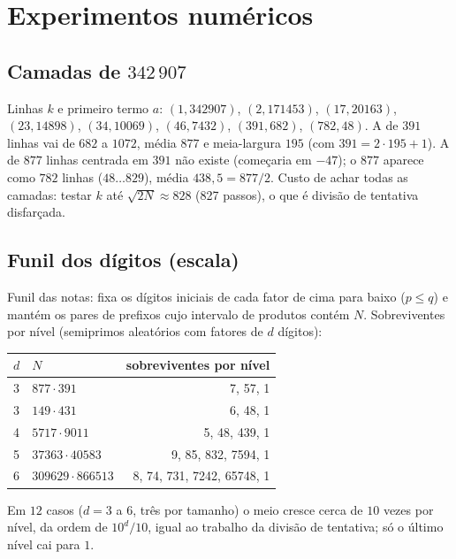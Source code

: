 \documentclass[11pt,a4paper]{article}
\begin{document}
\section{Experimentos numéricos}

\subsection{Camadas de $342\,907$}
Linhas $k$ e primeiro termo $a$: $(1,342907)$, $(2,171453)$, $(17,20163)$, $(23,14898)$, $(34,10069)$, $(46,7432)$, $(391,682)$, $(782,48)$. A de $391$ linhas vai de $682$ a $1072$, média $877$ e meia-largura $195$ (com $391=2\cdot195+1$). A de $877$ linhas centrada em $391$ não existe (começaria em $-47$); o $877$ aparece como $782$ linhas ($48\ldots829$), média $438{,}5=877/2$. Custo de achar todas as camadas: testar $k$ até $\sqrt{2N}\approx828$ (827 passos), o que é divisão de tentativa disfarçada.

\subsection{Funil dos dígitos (escala)}
Funil das notas: fixa os dígitos iniciais de cada fator de cima para baixo ($p\le q$) e mantém os pares de prefixos cujo intervalo de produtos contém $N$. Sobreviventes por nível (semiprimos aleatórios com fatores de $d$ dígitos):
\begin{center}
\begin{tabular}{llr}
\toprule
$d$ & $N$ & sobreviventes por nível \\
\midrule
3 & $877\cdot391$ & 7, 57, 1 \\
3 & $149\cdot431$ & 6, 48, 1 \\
4 & $5717\cdot9011$ & 5, 48, 439, 1 \\
5 & $37363\cdot40583$ & 9, 85, 832, 7594, 1 \\
6 & $309629\cdot866513$ & 8, 74, 731, 7242, 65748, 1 \\
\bottomrule
\end{tabular}
\end{center}
Em $12$ casos ($d=3$ a $6$, três por tamanho) o meio cresce cerca de $10$ vezes por nível, da ordem de $10^{d}/10$, igual ao trabalho da divisão de tentativa; só o último nível cai para $1$.
\end{document}
